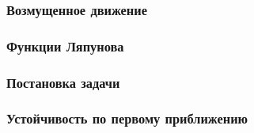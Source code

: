 \subsubsection*{Возмущенное движение}

\subsubsection*{Функции Ляпунова}


\subsubsection*{Постановка задачи}

\subsubsection*{Устойчивость по первому приближению}
